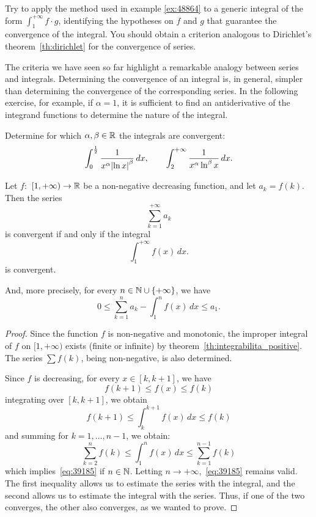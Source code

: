 \begin{exercise}
    Try to apply the method used in example \ref{ex:48864} to a generic integral
  of the form $\int_1^{+\infty} f\cdot g$, identifying the hypotheses on $f$ and
  $g$ that guarantee the convergence of the integral. You should obtain a
  criterion analogous to Dirichlet's theorem~\ref{th:dirichlet} for the
  convergence of series.
\end{exercise}


The criteria we have seen so far highlight a remarkable analogy between series
and integrals. Determining the convergence of an integral is, in general,
simpler than determining the convergence of the corresponding series. In the
following exercise, for example, if $\alpha=1$, it is sufficient to find an
antiderivative of the integrand functions to determine the nature of the
integral.

\begin{exercise}
Determine for which $\alpha,\beta\in {\mathbb R}$ the integrals are convergent:
\[
  \int_0^{\frac 1 2} \frac{1}{x^\alpha {\left|\ln x\right|}^\beta}\, dx,
  \qquad
  \int_2^{+\infty} \frac{1}{x^\alpha \ln^\beta x} \, dx.
\]
\end{exercise}

\begin{theorem}
\mymark{**}
Let $f\colon$ $[1,+\infty)\to {\mathbb R}$ be a non-negative decreasing function, and
let $a_k=f(k)$. Then the series
\[
   \sum_{k=1}^{+\infty} a_k
\]
is convergent if and only if the integral
\[
  \int_1^{+\infty} f(x)\, dx.
\]
is convergent.

And, more precisely, for every $n\in {\mathbb N}\cup{\left\{ +\infty \right\}}$, we have
\begin{equation}\label{eq:39185}
  0
  \le \sum_{k=1}^{n} a_k - \int_1^{n}f(x)\, dx
  \le a_1.
\end{equation}

\end{theorem}
%
\begin{proof}
\mymark{**}
Since the function $f$ is non-negative and monotonic, the improper integral of
$f$ on $[1,+\infty)$ exists (finite or infinite) by
theorem~\ref{th:integrabilita_positive}. The series $\sum f(k)$, being
non-negative, is also determined.

Since $f$ is decreasing, for every $x \in [k,k+1]$, we have
\[
  f(k+1) \le f(x) \le f(k)
\]
integrating over $[k,k+1]$, we obtain
\[
  f(k+1) \le \int_{k}^{k+1} f(x)\, dx \le f(k)
\]
and summing for $k=1,\dots, n-1$, we obtain:
\[
  \sum_{k=2}^{n} f(k) \le \int_{1}^{n} f(x)\, dx \le \sum_{k=1}^{n-1} f(k)
\]
which implies~\eqref{eq:39185} if $n\in {\mathbb N}$. Letting
$n\to+\infty$,~\eqref{eq:39185} remains valid. The first inequality allows us to
estimate the series with the integral, and the second allows us to estimate the
integral with the series. Thus, if one of the two converges, the other also
converges, as we wanted to prove.
\end{proof}

